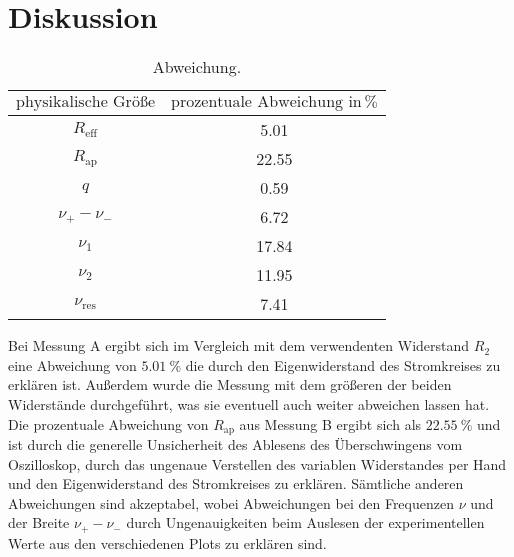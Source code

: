\section{Diskussion}
\label{sec:Diskussion}

\begin{table}[h]
  \centering
  \label{tab:abw}
  \begin{tabular}{ c c }
    \toprule
   $\text{physikalische Größe}$
   &{$\text{prozentuale Abweichung}\,\, \text{in} \, \si{\percent} $} \\

    \midrule
    $R_{\text{eff}}$ & 5.01 \\
    $R_{\text{ap}}$& 22.55  \\
    $q$ & 0.59 \\
    $\nu_{+}-\nu_{-}$ & 6.72 \\
    $\nu_{\text{1}}$ & 17.84\\
    $\nu_{\text{2}}$ & 11.95 \\
    $\nu_{\text{res}}$ & 7.41\\
    \bottomrule
  \end{tabular}
  \caption{Abweichung.}
\end{table}

Bei Messung A ergibt sich im Vergleich mit dem verwendenten Widerstand $R_{\text{2}}$
eine Abweichung von $\SI{5.01}{\percent}$ die durch den Eigenwiderstand des Stromkreises zu erklären ist.
Außerdem wurde die Messung mit dem größeren der beiden Widerstände durchgeführt, was sie
eventuell auch weiter abweichen lassen hat.
Die prozentuale Abweichung von $R_{\text{ap}}$ aus Messung B ergibt sich als
$\SI{22.55}{\percent}$ und ist durch die generelle Unsicherheit des Ablesens des Überschwingens vom
Oszilloskop, durch das ungenaue Verstellen des variablen Widerstandes per Hand
und den Eigenwiderstand des Stromkreises zu erklären.
Sämtliche anderen Abweichungen sind akzeptabel, wobei Abweichungen bei den Frequenzen
$\nu$ und der Breite $\nu_{+}-\nu_{-}$ durch Ungenauigkeiten beim Auslesen der
experimentellen Werte aus den verschiedenen Plots zu erklären sind.
